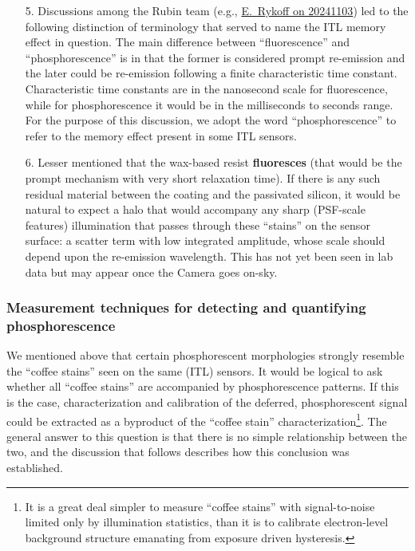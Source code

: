 \begin{itemize}
    \item[5.] Discussions among the Rubin team (e.g., \href{https://rubin-obs.slack.com/archives/C07QS3Z25PU/p1730661864474399}{E.~Rykoff on 20241103}) led to the following distinction of terminology that served to name the ITL memory effect in question. The main difference between ``fluorescence'' and ``phosphorescence'' is in that the former is considered prompt re-emission and the later could be re-emission following a finite characteristic time constant. Characteristic time constants are in the nanosecond scale for fluorescence, while for phosphorescence it would be in the milliseconds to seconds range. For the purpose of this discussion, we adopt the word ``phosphorescence'' to refer to the memory effect present in some ITL sensors.
    \item[6.] Lesser mentioned that the wax-based resist {\bf fluoresces} (that would be the prompt mechanism with very short relaxation time). If there is any such residual material between the coating and the passivated silicon, it would be natural to expect a halo that would accompany any sharp (PSF-scale features) illumination that passes through these ``stains'' on the sensor surface: a scatter term with low integrated amplitude, whose scale should depend upon the re-emission wavelength. This has not yet been seen in lab data but may appear once the Camera goes on-sky.
    
\end{itemize}

\subsubsection{Measurement techniques for detecting and quantifying phosphorescence}\label{phos-measurement}
We mentioned above that certain phosphorescent morphologies strongly resemble the ``coffee stains'' seen on the same (ITL) sensors. It would be logical to ask whether all ``coffee stains'' are accompanied by phosphorescence patterns. If this is the case, characterization and calibration of the deferred, phosphorescent signal could be extracted as a byproduct of the ``coffee stain'' characterization\footnote{It is a great deal simpler to measure ``coffee stains'' with signal-to-noise limited only by illumination statistics, than it is to calibrate electron-level background structure emanating from exposure driven hysteresis.}. The general answer to this question is that there is no simple relationship between the two, and the discussion that follows describes how this conclusion was established. 


